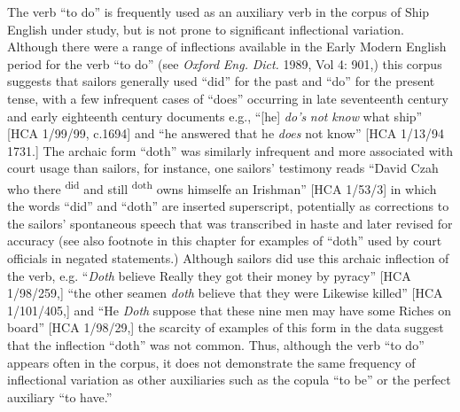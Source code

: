 The verb “to do” is frequently used as an auxiliary verb in the corpus of Ship English under study, but is not prone to significant inflectional variation. Although there were a range of inflections available in the Early Modern English period for the verb “to do” (see \textit{Oxford} \textit{Eng.} \textit{Dict.} 1989, Vol 4: 901,) this corpus suggests that sailors generally used “did” for the past and “do” for the present tense, with a few infrequent cases of “does” occurring in late seventeenth century and early eighteenth century documents e.g., “[he] \textit{do’s} \textit{not} \textit{know} what ship” [HCA 1/99/99, c.1694] and “he answered that he \textit{does} not know” [HCA 1/13/94 1731.] The archaic form “doth” was similarly infrequent and more associated with court usage than sailors, for instance, one sailors’ testimony reads “David Czah who there \textsuperscript{did} and still \textsuperscript{doth} owns himselfe an Irishman” [HCA 1/53/3] in which the words “did” and “doth” are inserted superscript, potentially as corrections to the sailors’ spontaneous speech that was transcribed in haste and later revised for accuracy (see also footnote in this chapter for examples of “doth” used by court officials in negated statements.) Although sailors did use this archaic inflection of the verb, e.g. “\textit{Doth} believe Really they got their money by pyracy” [HCA 1/98/259,] “the other seamen \textit{doth} believe that they were Likewise killed” [HCA 1/101/405,] and “He \textit{Doth} suppose that these nine men may have some Riches on board” [HCA 1/98/29,] the scarcity of examples of this form in the data suggest that the inflection “doth” was not common. Thus, although the verb “to do” appears often in the corpus, it does not demonstrate the same frequency of inflectional variation as other auxiliaries such as the copula “to be” or the perfect auxiliary “to have.” 

